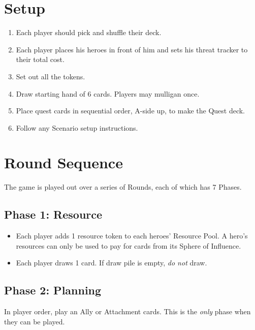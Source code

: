 \documentclass[12pt]{article}
\newenvironment{enumerateCustom}
{\begin{enumerate}
  \setlength{\itemsep}{1pt}
  \setlength{\parskip}{0pt}
  \setlength{\parsep}{0pt}}
{\end{enumerate}}
\newenvironment{itemizeCustom}
{\begin{itemize}
  \setlength{\itemsep}{1pt}
  \setlength{\parskip}{0pt}
  \setlength{\parsep}{0pt}}
{\end{itemize}}
\begin{document}
\begin{multicols*}{2}

\section*{Setup}
\begin{enumerateCustom}
	\item Each player should pick and shuffle their deck.
	\item Each player places his heroes in front of him and sets his threat tracker to their total cost.
	\item Set out all the tokens.
	\item Draw starting hand of 6 cards. Players may mulligan once.
	\item Place quest cards in sequential order, A-side up, to make the Quest deck.
	\item Follow any Scenario setup instructions.
\end{enumerateCustom}

\section*{Round Sequence}
The game is played out over a series of Rounds, each of which has 7 Phases.

\subsection*{Phase 1: Resource}
\begin{itemizeCustom}
	\item Each player adds 1 resource token to each heroes' Resource Pool. A hero's resources can only be used to pay for cards from its Sphere of Influence.
	\item Each player draws 1 card. If draw pile is empty, \emph{do not} draw.
\end{itemizeCustom}

\subsection*{Phase 2: Planning}
In player order, play an Ally or Attachment cards. This is the \emph{only} phase when they can be played.


\end{multicols*}
\end{document}
